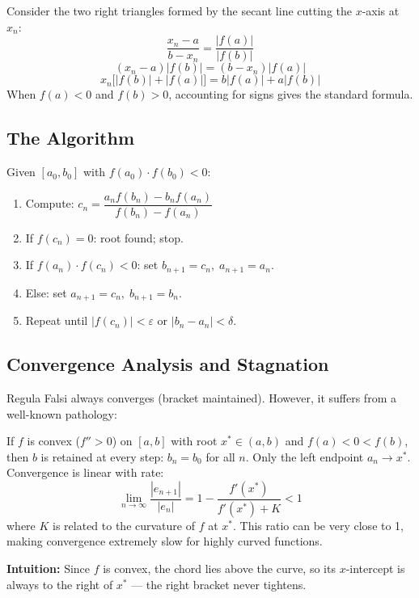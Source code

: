 \documentclass[12pt]{article}
\begin{document}
\bigskip

\begin{derivbox}
Consider the two right triangles formed by the secant line cutting the $x$-axis at $x_n$:
\[
  \frac{x_n - a}{b - x_n} = \frac{|f(a)|}{|f(b)|}
\]
\[
  (x_n - a)|f(b)| = (b - x_n)|f(a)|
\]
\[
  x_n\bigl[|f(b)| + |f(a)|\bigr] = b|f(a)| + a|f(b)|
\]
When $f(a) < 0$ and $f(b) > 0$, accounting for signs gives the standard formula.
\end{derivbox}

\bigskip

\subsection*{The Algorithm}

\begin{defbox}
Given $[a_0,b_0]$ with $f(a_0)\cdot f(b_0)<0$:
\begin{enumerate}[noitemsep]
  \item Compute: $c_n = \dfrac{a_n f(b_n)-b_n f(a_n)}{f(b_n)-f(a_n)}$
  \item If $f(c_n)=0$: root found; stop.
  \item If $f(a_n)\cdot f(c_n)<0$: set $b_{n+1}=c_n,\;a_{n+1}=a_n$.
  \item Else: set $a_{n+1}=c_n,\;b_{n+1}=b_n$.
  \item Repeat until $|f(c_n)|<\varepsilon$ or $|b_n-a_n|<\delta$.
\end{enumerate}
\end{defbox}

\subsection*{Convergence Analysis and Stagnation}

Regula Falsi always converges (bracket maintained). However, it suffers from a well-known pathology:

\begin{thmbox}
If $f$ is convex ($f''>0$) on $[a,b]$ with root $x^*\in(a,b)$ and $f(a)<0<f(b)$, then $b$ is retained at every step: $b_n=b_0$ for all $n$. Only the left endpoint $a_n\to x^*$. Convergence is linear with rate:
\[
  \lim_{n\to\infty}\frac{|e_{n+1}|}{|e_n|} = 1 - \frac{f'(x^*)}{f'(x^*)+K} < 1
\]
where $K$ is related to the curvature of $f$ at $x^*$. This ratio can be very close to 1, making convergence extremely slow for highly curved functions.

\medskip
\textbf{Intuition:} Since $f$ is convex, the chord lies above the curve, so its $x$-intercept is always to the right of $x^*$ — the right bracket never tightens.
\end{thmbox}
\end{document}
